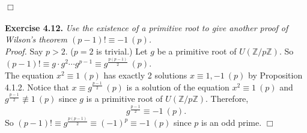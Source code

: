 \documentclass{article}
\begin{document}
$\Box$ \\\\



\textbf{Exercise 4.12.} \emph{Use the existence of a primitive root to give another proof
of Wilson's theorem $(p - 1)! \equiv -1 \: (p)$.} \\

\emph{Proof.}
Say $p > 2$. ($p = 2$ is trivial.)
Let $g$ be a primitive root of $U(\mathbb{Z}/p\mathbb{Z})$.
So $(p - 1)! \equiv g \cdot g^2 \cdots g^{p - 1} \equiv g^{\frac{p(p - 1)}{2}} \: (p)$. \\

The equation $x^2 \equiv 1 \: (p)$ has exactly 2 solutions $x \equiv 1, -1 \: (p)$
by Proposition 4.1.2.
Notice that $x \equiv g^{\frac{p - 1}{2}} \: (p)$ is a solution of the equation
$x^2 \equiv 1 \: (p)$ and $g^{\frac{p - 1}{2}} \not\equiv 1 \: (p)$
since $g$ is a primitive root of $U(\mathbb{Z}/p\mathbb{Z})$.
Therefore, $$g^{\frac{p - 1}{2}} \equiv -1 \: (p).$$
So $(p - 1)! \equiv g^{\frac{p(p - 1)}{2}} \equiv (-1)^p \equiv -1 \: (p)$
since $p$ is an odd prime.
$\Box$ \\
\end{document}
